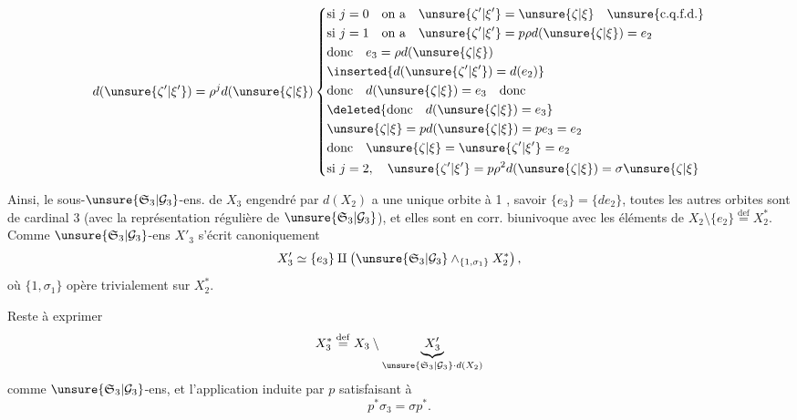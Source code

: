 \[
d(\unsure{\zeta'|\xi'})=\rho^j d(\unsure{\zeta|\xi})
\left\{\begin{aligned}
&\text{si }j=0\quad\text{on a}\quad\unsure{\zeta'|\xi'}=\unsure{\zeta|\xi}\quad\unsure{\text{c.q.f.d.}}\\
&\text{si }j=1\quad\text{on a}\quad\unsure{\zeta'|\xi'}=p\rho d(\unsure{\zeta|\xi})=e_2\\
&\text{donc}\quad e_3=\rho d(\unsure{\zeta|\xi})\\
&\inserted{d(\unsure{\zeta'|\xi'})=d(e_2)}\\
&\text{donc}\quad d(\unsure{\zeta|\xi})=e_3\quad\text{donc}\\
&\deleted{\text{donc}\quad d(\unsure{\zeta|\xi})=e_3}\\
&\unsure{\zeta|\xi}=pd(\unsure{\zeta|\xi})=pe_3=e_2\\
&\text{donc}\quad\unsure{\zeta|\xi}=\unsure{\zeta'|\xi'}=e_2\\
&\text{si }j=2,\quad\unsure{\zeta'|\xi'}=p\rho^2d(\unsure{\zeta|\xi})=\sigma\unsure{\zeta|\xi}
\end{aligned}\right.
\]


Ainsi, le sous-$\unsure{\mathfrak S_3|\mathcal G_3}$-ens.  de $X_3$ engendré par $d(X_2)$ a une unique orbite à 1 , savoir $\{e_3\}=\{de_2\}$, toutes les autres orbites sont de cardinal 3  (avec la représentation régulière de $\unsure{\mathfrak S_3|\mathcal G_3}$), et elles sont en corr. biunivoque avec les éléments de $X_2\setminus\{e_2\}\overset{\mathrm{def}}=X_2^*$. Comme $\unsure{\mathfrak S_3|\mathcal G_3}$-ens $X'_3$ s'écrit canoniquement
\[
X'_3\simeq\{e_3\}\amalg\left(\unsure{\mathfrak S_3|\mathcal G_3}\wedge_{\{1,\sigma_1\}}X_2^*\right),
\]
où $\{1,\sigma_1\}$ opère trivialement sur $X_2^*$.


Reste à exprimer
\[
X_3^*\overset{\mathrm{def}}=X_3\setminus\underbrace{X'_3}_{\unsure{\mathfrak S_3|\mathcal G_3}\cdot d(X_2)}
\]
comme $\unsure{\mathfrak S_3|\mathcal G_3}$-ens, et l'application induite par $p$
satisfaisant à
\[
\boxed{p^*\sigma_3=\sigma p^*}.
\]

